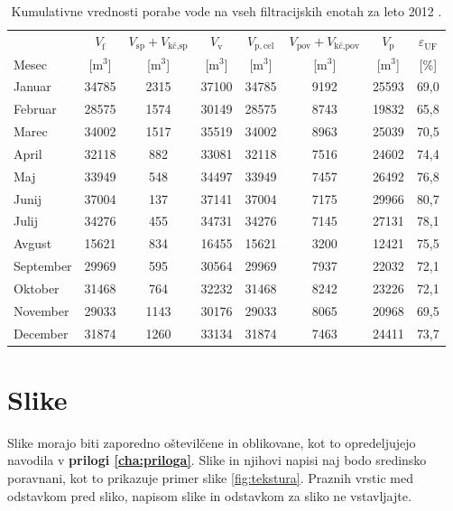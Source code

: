 \begin{table}[htbp]
	\caption{Kumulativne vrednosti porabe vode na vseh filtracijskih enotah za leto 2012 \cite{grote2021}.}\label{tab:poraba}
	\setlength{\tabcolsep}{4pt}
	\renewcommand{\arraystretch}{1.3}
\begin{tabular*}{\textwidth}{@{\extracolsep{\fill}}l*{7}{c}@{}}
	\toprule
	& $V_\mathrm{f}$
	& $V_\mathrm{sp} + V_\text{kč,sp}$
	& $V_\mathrm{v}$
	& $V_\mathrm{p,cel}$
	& $V_\mathrm{pov} + V_\text{kč,pov}$
	& $V_\mathrm{p}$
	& $\varepsilon_\mathrm{UF}$ \\
	Mesec & [m$^3$] & [m$^3$] & [m$^3$] & [m$^3$] & [m$^3$] & [m$^3$] & [\%] \\
	\midrule
	Januar    & 34785 & 2315 & 37100 & 34785 & 9192 & 25593 & 69,0 \\
	Februar   & 28575 & 1574 & 30149 & 28575 & 8743 & 19832 & 65,8 \\
	Marec     & 34002 & 1517 & 35519 & 34002 & 8963 & 25039 & 70,5 \\
	April     & 32118 &  882 & 33081 & 32118 & 7516 & 24602 & 74,4 \\
	Maj       & 33949 &  548 & 34497 & 33949 & 7457 & 26492 & 76,8 \\
	Junij     & 37004 &  137 & 37141 & 37004 & 7175 & 29966 & 80,7 \\
	Julij     & 34276 &  455 & 34731 & 34276 & 7145 & 27131 & 78,1 \\
	Avgust    & 15621 &  834 & 16455 & 15621 & 3200 & 12421 & 75,5 \\
	September & 29969 &  595 & 30564 & 29969 & 7937 & 22032 & 72,1 \\
	Oktober   & 31468 &  764 & 32232 & 31468 & 8242 & 23226 & 72,1 \\
	November  & 29033 & 1143 & 30176 & 29033 & 8065 & 20968 & 69,5 \\
	December  & 31874 & 1260 & 33134 & 31874 & 7463 & 24411 & 73,7 \\
	\bottomrule
\end{tabular*}
\end{table}


\section{Slike}\label{sec:slike}
Slike morajo biti zaporedno oštevilčene in oblikovane, kot to opredeljujejo navodila v \textbf{prilogi \ref{cha:priloga}}. Slike in njihovi napisi naj bodo sredinsko poravnani, kot to prikazuje primer slike \ref{fig:tekstura}. Praznih vrstic med odstavkom pred sliko, napisom slike in odstavkom za sliko ne vstavljajte.

